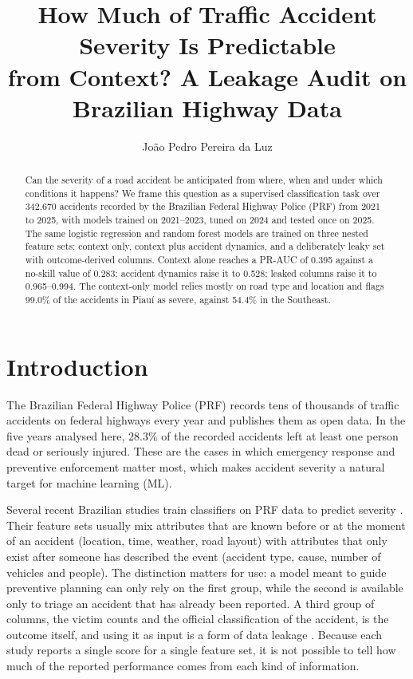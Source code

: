 \documentclass[12pt]{article}
\title{How Much of Traffic Accident Severity Is Predictable\\
from Context? A Leakage Audit on Brazilian Highway Data}
\author{Jo\~ao Pedro Pereira da Luz\inst{1}}
\begin{document}
\maketitle

\begin{abstract}
Can the severity of a road accident be anticipated from where, when and under
which conditions it happens? We frame this question as a supervised
classification task over 342,670 accidents recorded by the Brazilian Federal
Highway Police (PRF) from 2021 to 2025, with models trained on 2021--2023,
tuned on 2024 and tested once on 2025. The same logistic regression and random
forest models are trained on three nested feature sets: context only, context
plus accident dynamics, and a deliberately leaky set with outcome-derived
columns. Context alone reaches a PR-AUC of 0.395 against a no-skill value of
0.283; accident dynamics raise it to 0.528; leaked columns raise it to
0.965--0.994. The context-only model relies mostly on road type and location and
flags 99.0\% of the accidents in Piau\'i as severe, against 54.4\% in the
Southeast.
\end{abstract}

\section{Introduction}

The Brazilian Federal Highway Police (PRF) records tens of thousands of traffic
accidents on federal highways every year and publishes them as open data. In the five years
analysed here, 28.3\% of the recorded accidents left at least one person dead
or seriously injured. These are the cases in which emergency response and
preventive enforcement matter most, which makes accident severity a natural
target for machine learning (ML).

Several recent Brazilian studies train classifiers on PRF data to predict
severity \cite{gabardo2025,mafort2025,fuhr2025}. Their feature sets usually mix
attributes that are known before or at the moment of an accident (location,
time, weather, road layout) with attributes that only exist after someone has
described the event (accident type, cause, number of vehicles and people). The
distinction matters for use: a model meant to guide preventive planning can
only rely on the first group, while the second is available only to triage an
accident that has already been reported. A third group of columns, the victim
counts and the official classification of the accident, is the outcome itself,
and using it as input is a form of data leakage
\cite{kaufman2012,kapoor2023}. Because each study reports a single score for a
single feature set, it is not possible to tell how much of the reported
performance comes from each kind of information.
\end{document}
